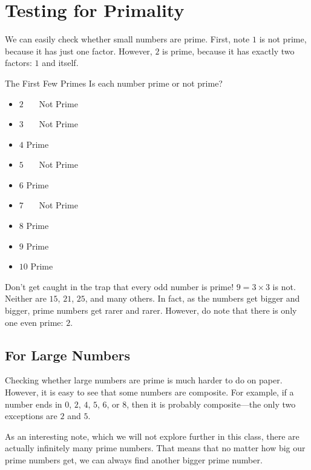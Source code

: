\documentclass[a4paper,10pt]{report}
\begin{document}
\section{Testing for Primality}

We can easily check whether small numbers are prime. First, note \(1\) is not
prime, because it has just one factor. However, \(2\) is prime, because it has
exactly two factors: \(1\) and itself.

\begin{problem}{The First Few Primes}
 Is each number prime or not prime?

 \begin{itemize}
  \item \(2\) \hfill {}~~~Not Prime
  \item \(3\) \hfill {}~~~Not Prime
  \item \(4\) \hfill Prime~~~
  \item \(5\) \hfill {}~~~Not Prime
  \item \(6\) \hfill Prime~~~
  \item \(7\) \hfill {}~~~Not Prime
  \item \(8\) \hfill Prime~~~
  \item \(9\) \hfill Prime~~~
  \item \(10\) \hfill Prime~~~
 \end{itemize}
\end{problem}

Don't get caught in the trap that every odd number is prime! \(9=3\times3\) is
not. Neither are \(15\), \(21\), \(25\), and many others. In fact, as the
numbers get bigger and bigger, prime numbers get rarer and rarer. However, do
note that there is only one even prime: \(2\).

\subsection{For Large Numbers}

Checking whether large numbers are prime is much harder to do on paper.
However, it is easy to see that some numbers are composite. For example, if a
number ends in \(0\), \(2\), \(4\), \(5\), \(6\), or \(8\), then it is probably
composite---the only two exceptions are \(2\) and \(5\).

As an interesting note, which we will not explore further in this class, there
are actually infinitely many prime numbers. That means that no matter how big
our prime numbers get, we can always find another bigger prime number.
\end{document}
